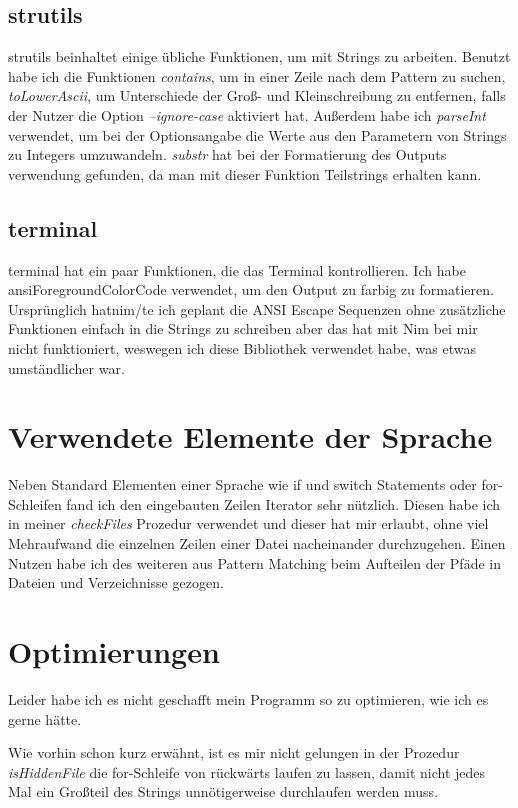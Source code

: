 \documentclass[11pt]{report}
\begin{document}
\subsection{strutils}
strutils beinhaltet einige übliche Funktionen, um mit Strings zu arbeiten.
Benutzt habe ich die Funktionen \emph{contains}, um in einer Zeile nach dem Pattern zu suchen, \emph{toLowerAscii}, um Unterschiede der Groß- und Kleinschreibung zu entfernen, falls der Nutzer die Option \emph{--ignore-case} aktiviert hat. Außerdem habe ich \emph{parseInt} verwendet, um bei der Optionsangabe die Werte aus den Parametern von Strings zu Integers umzuwandeln.
\emph{substr} hat bei der Formatierung des Outputs verwendung gefunden, da man mit dieser Funktion Teilstrings erhalten kann.
\subsection{terminal}
terminal hat ein paar Funktionen, die das Terminal kontrollieren.
Ich habe ansiForegroundColorCode verwendet, um den Output zu farbig zu formatieren. Ursprünglich hatnim/te ich geplant die ANSI Escape Sequenzen ohne zusätzliche Funktionen einfach in die Strings zu schreiben aber das hat mit Nim bei mir nicht funktioniert, weswegen ich diese Bibliothek verwendet habe, was etwas umständlicher war.

\section{Verwendete Elemente der Sprache}
Neben Standard Elementen einer Sprache wie if und switch Statements oder for-Schleifen fand ich den eingebauten Zeilen Iterator sehr nützlich. Diesen habe ich in meiner \emph{checkFiles} Prozedur verwendet und dieser hat mir erlaubt, ohne viel Mehraufwand die einzelnen Zeilen einer Datei nacheinander durchzugehen.
Einen Nutzen habe ich des weiteren aus Pattern Matching beim Aufteilen der Pfäde in Dateien und Verzeichnisse gezogen.

\section{Optimierungen}
Leider habe ich es nicht geschafft mein Programm so zu optimieren, wie ich es gerne hätte.


Wie vorhin schon kurz erwähnt, ist es mir nicht gelungen in der Prozedur \emph{isHiddenFile} die for-Schleife von rückwärts laufen zu lassen, damit nicht jedes Mal ein Großteil des Strings unnötigerweise durchlaufen werden muss.
\end{document}
